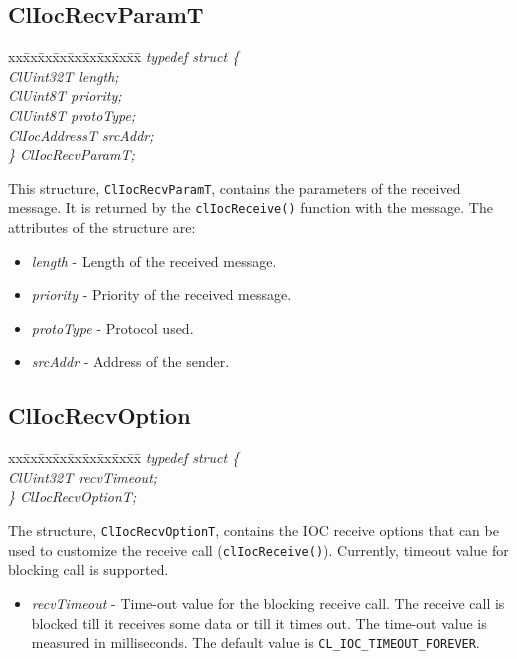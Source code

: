 \begin{flushleft}
\subsection{ClIocRecvParamT}
\begin{tabbing}
xx\=xx\=xx\=xx\=xx\=xx\=xx\=xx\=xx\=\kill
\textit{typedef struct \{}\\
\>\>\>\>\textit{ClUint32T length;}\\
\>\>\>\>\textit{ClUint8T priority;}\\
\>\>\>\>\textit{ClUint8T protoType;}\\
\>\>\>\>\textit{ClIocAddressT srcAddr;}\\
\textit{\} ClIocRecvParamT;}\end{tabbing}
This structure, {\tt{ClIocRecvParamT}}, contains the parameters of the received message. It is returned by the {\tt{clIocReceive()}}
function with the message. The attributes of the structure are:
\begin{itemize}
\item
\textit{length} - Length of the received message.
\item
\textit{priority} - Priority of the received message.
\item
\textit{protoType} - Protocol used.
\item
\textit{srcAddr} - Address of the sender.
\end{itemize}



\subsection{ClIocRecvOption}
\begin{tabbing}
xx\=xx\=xx\=xx\=xx\=xx\=xx\=xx\=xx\=\kill
\textit{typedef struct \{}\\
\>\>\>\>\textit{ClUint32T recvTimeout;}\\
\textit{\} ClIocRecvOptionT;}\end{tabbing}
The structure, {\tt{ClIocRecvOptionT}}, contains the IOC receive options that can be used to customize the receive call ({\tt{clIocReceive()}}).
Currently, timeout value for blocking call is supported. 
\begin{itemize}
\item
\textit{recvTimeout} - Time-out value for the blocking receive call. The receive call is blocked till it
receives some data or till it times out. The time-out value is measured in milliseconds. The
default value is {\tt{CL\_\-IOC\_\-TIMEOUT\_\-FOREVER}}.
\end{itemize}



\end{flushleft}
